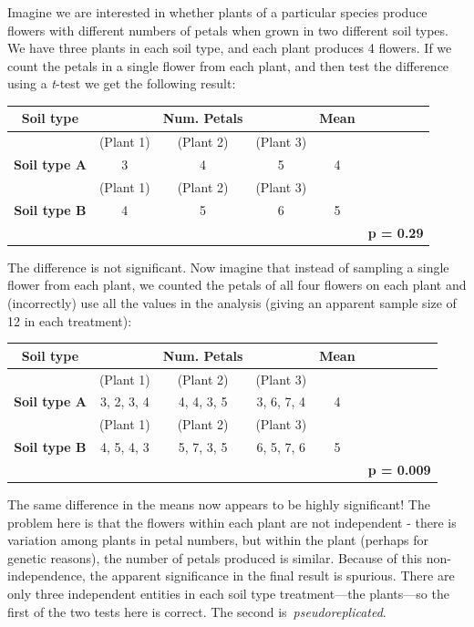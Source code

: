 \documentclass[
]{book}
\begin{document}
Imagine we are interested in whether plants of a particular species produce flowers with different numbers of petals when grown in two different soil types. We have three plants in each soil type, and each plant produces 4 flowers. If we count the petals in a single flower from each plant, and then test the difference using a \emph{t}-test we get the following result:

\begin{longtable}[]{@{}cccccc@{}}
\toprule
\textbf{Soil type} & & \textbf{Num. Petals} & & \textbf{Mean} & \\
\midrule
\endhead
& (Plant 1) & (Plant 2) & (Plant 3) & & \\
\textbf{Soil type A} & 3 & 4 & 5 & 4 & \\
& (Plant 1) & (Plant 2) & (Plant 3) & & \\
\textbf{Soil type B} & 4 & 5 & 6 & 5 & \\
& & & & & \textbf{p = 0.29} \\
\bottomrule
\end{longtable}

The difference is not significant. Now imagine that instead of sampling a single flower from each plant, we counted the petals of all four flowers on each plant and (incorrectly) use all the values in the analysis (giving an apparent sample size of 12 in each treatment):

\begin{longtable}[]{@{}cccccc@{}}
\toprule
\textbf{Soil type} & & \textbf{Num. Petals} & & \textbf{Mean} & \\
\midrule
\endhead
& (Plant 1) & (Plant 2) & (Plant 3) & & \\
\textbf{Soil type A} & 3, 2, 3, 4 & 4, 4, 3, 5 & 3, 6, 7, 4 & 4 & \\
& (Plant 1) & (Plant 2) & (Plant 3) & & \\
\textbf{Soil type B} & 4, 5, 4, 3 & 5, 7, 3, 5 & 6, 5, 7, 6 & 5 & \\
& & & & & \textbf{p = 0.009} \\
\bottomrule
\end{longtable}

The same difference in the means now appears to be highly significant! The problem here is that the flowers within each plant are not independent - there is variation among plants in petal numbers, but within the plant (perhaps for genetic reasons), the number of petals produced is similar. Because of this non-independence, the apparent significance in the final result is spurious. There are only three independent entities in each soil type treatment---the plants---so the first of the two tests here is correct. The second is~\emph{pseudoreplicated}.
\end{document}
